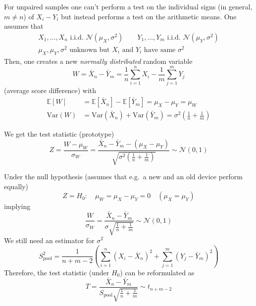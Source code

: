 For unpaired samples one can't perform a test on the individual signs (in general, $m\neq n$) of $X_i-Y_i$ but instead performs a test on the arithmetic means. One assumes that
\begin{gather*}
    X_1,\dots,X_n\text{ i.i.d. }\mathcal{N}(\mu_X,\sigma^2) \qquad Y_1,\dots,Y_m\text{ i.i.d. }\mathcal{N}(\mu_Y,\sigma^2) \\
    \mu_X,\mu_Y,\sigma^2 \text{ unknown but $X_i$ and $Y_i$ have same $\sigma^2$}
\end{gather*}
Then, one creates a new \textit{normally distributed} random variable
\begin{equation*}
    W = \bar{X}_n-\bar{Y}_m=\frac{1}{n}\sum_{i=1}^{n} X_i-\frac{1}{m}\sum_{j=1}^{m} Y_j
\end{equation*}
(average score difference) with
\begin{align*}
    \mathbb{E}[W]   & =\mathbb{E}[\bar{X}_n]-\mathbb{E}[\bar{Y}_m]=\mu_X-\mu_Y = \mu_W                              \\
    \mathrm{Var}(W) & =\mathrm{Var}(\bar{X}_n)+\mathrm{Var}(\bar{Y}_m)=\sigma^2\left(\frac{1}{n}+\frac{1}{m}\right)
\end{align*}


We get the test statistic (prototype)
\begin{equation*}
    Z=\frac{W-\mu_W}{\sigma_W}=\frac{\bar{X}_n-\bar{Y}_m-(\mu_X-\mu_Y)}{\sqrt{\sigma^2\left(\frac{1}{n}+\frac{1}{m}\right)}}\sim\mathcal{N}(0,1)
\end{equation*}

Under the null hypothesis (assumes that e.g.\ a new and an old device perform equally)
\begin{equation*}
    Z=H_0{:}\quad \mu_W = \mu_X-\mu_Y=0\quad(\mu_X=\mu_Y)
\end{equation*}
implying
\begin{equation*}
    \frac{W}{\sigma_W} = \frac{\bar{X}_n-\bar{Y}_m}{\sigma\sqrt{\frac{1}{n}+\frac{1}{m}}}\sim\mathcal{N}(0,1)
\end{equation*}
We still need an estimator for $\sigma^2$
\begin{equation*}
    S_{\text{pool}}^2=\frac{1}{n+m-2}\left(\sum_{i=1}^n{(X_i-\bar{X}_n)}^2+\sum_{j=1}^m{(Y_j-\bar{Y}_m)}^2\right)
\end{equation*}
Therefore, the test statistic (under $H_0$) can be reformulated as
\begin{equation*}
    T=\frac{\bar{X}_n-\bar{Y}_m}{S_\text{pool}\sqrt{\frac1n+\frac1m}}\sim t_{n+m-2}
\end{equation*}

